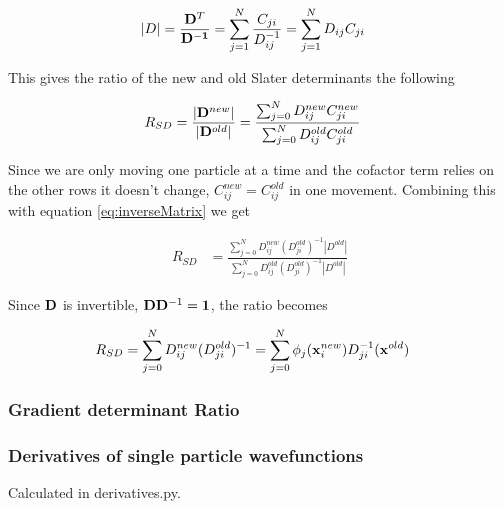 \documentclass[11pt]{article}
\begin{document}
			\begin{align}
				|D| &= \frac{\vb{D}^T}{\vb{D^{-1}}} = \sum_{j=1}^{N}{\frac{C_{ji}  }{ D^{-1}_{ij} } } = \sum_{j=1}^{N}{ D_{ij}C_{ji} }
				\label{eq:inverseMatrix}
			\end{align}

			This gives the ratio of the new and old Slater determinants the following

			\begin{align}
				R_{SD} &= \frac{|\vb{D}^{new}|}{|\vb{D}^{old}|} = \frac{\sum_{j=0}^N D_{ij}^{new} C_{ji}^{new} }{\sum_{j=0}^N D_{ij}^{old} C_{ji}^{old} }
			\end{align}

			Since we are only moving one particle at a time and the cofactor term relies on the other rows it doesn't change, \(C^{new}_{ij} = C^{old}_{ij}\) in one movement. Combining this with equation \eqref{eq:inverseMatrix} we get

			\begin{align}
				R_{SD} &=  \frac{\sum_{j=0}^N D_{ij}^{new} (D_{ji}^{old})^{-1} |D^{old}| }{\sum_{j=0}^N D_{ij}^{old} (D_{ji}^{old})^{-1} |D^{old}| }
			\end{align}

			Since \(\vb{D}\) is invertible, \(\vb{D}\vb{D}^{-1} = \vb{1}\), the ratio becomes

			\begin{align}
				R_{SD} &= \sum_{j = 0}^{N}D_{ij}^{new}(D_{ji}^{old})^{-1} = \sum_{j = 0}^{N} \phi_j(\vb{x}^{new}_i) D_{ji}^{-1}(\vb{x}^{old})
			\end{align}

		\subsubsection{Gradient determinant Ratio}


		\subsubsection{Derivatives of single particle wavefunctions}
			Calculated in  derivatives.py.
\end{document}
